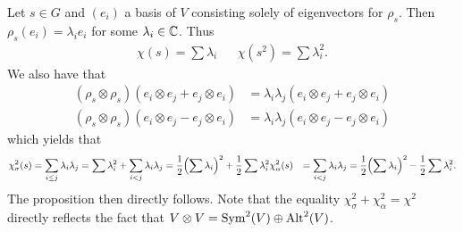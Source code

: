 \documentclass[letterpaper, 11pt, oneside]{book}
\begin{document}
\begin{pf}
  Let $s \in G$ and $(e_{i})$ a basis of $V$ consisting solely of eigenvectors for $\rho_{s}$.
  Then $\rho_{s}(e_{i}) = \lambda_{i}e_{i}$ for some $\lambda_{i} \in \mathbb{C}$.
  Thus
  \begin{align*}
    \chi(s) = \sum \lambda_{i} && \chi(s^{2}) = \sum \lambda_{i}^{2}.
  \end{align*}
  We also have that
  \begin{align*}
    (\rho_{s} \otimes \rho_{s})(e_{i} \otimes e_{j} + e_{j} \otimes e_{i}) &= \lambda_{i}\lambda_{j}(e_{i} \otimes e_{j} + e_{j} \otimes e_{i}) \\
    (\rho_{s} \otimes \rho_{s})(e_{i} \otimes e_{j} - e_{j} \otimes e_{i}) &= \lambda_{i}\lambda_{j}(e_{i} \otimes e_{j} - e_{j} \otimes e_{i})
  \end{align*}
  which yields that
  \begin{align*}
    \chi_{\sigma}^{2}(s) &= \sum_{i \leq j} \lambda_{i} \lambda_{j} = \sum \lambda_{i}^{2} + \sum_{i < j} \lambda_{i} \lambda_{j} = \frac{1}{2}\pqty{\sum \lambda_{i}}^{2} + \frac{1}{2} \sum \lambda_{i}^{2}
    \chi_{\alpha}^{2}(s) &= \sum_{i < j} \lambda_{i} \lambda_{j} = \frac{1}{2}\pqty{\sum \lambda_{i}}^{2} - \frac{1}{2} \sum \lambda_{i}^{2}.
  \end{align*}
  The proposition then directly follows.
  Note that the equality $\chi_{\sigma}^{2} + \chi_{\alpha}^{2} = \chi^{2}$ directly reflects the fact that $V \otimes V = \operatorname{Sym}^{2}(V) \oplus \operatorname{Alt}^{2}(V)$.
\end{pf}
\end{document}
